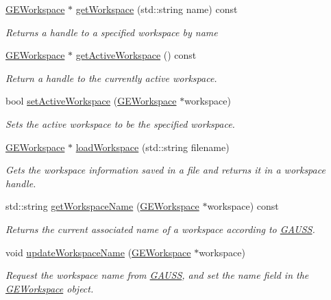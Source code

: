 \begin{DoxyCompactItemize}
\hyperlink{class_g_e_workspace}{G\+E\+Workspace} $\ast$ \hyperlink{class_g_a_u_s_s_a5b2fb78a745be14e4e66a4fd5c5388eb}{get\+Workspace} (std\+::string name) const
\begin{DoxyCompactList}\small\item\em Returns a handle to a specified workspace by {\itshape name} \end{DoxyCompactList}\item 
\hyperlink{class_g_e_workspace}{G\+E\+Workspace} $\ast$ \hyperlink{class_g_a_u_s_s_a34f3cc44cd296cc326ced670d2ac6a59}{get\+Active\+Workspace} () const
\begin{DoxyCompactList}\small\item\em Return a handle to the currently active workspace. \end{DoxyCompactList}\item 
bool \hyperlink{class_g_a_u_s_s_a6b94adbb7ad799f1e025cd4d7f08f75b}{set\+Active\+Workspace} (\hyperlink{class_g_e_workspace}{G\+E\+Workspace} $\ast$workspace)
\begin{DoxyCompactList}\small\item\em Sets the active workspace to be the specified workspace. \end{DoxyCompactList}\item 
\hyperlink{class_g_e_workspace}{G\+E\+Workspace} $\ast$ \hyperlink{class_g_a_u_s_s_a7735659dac094c3af6c438011afb2a77}{load\+Workspace} (std\+::string filename)
\begin{DoxyCompactList}\small\item\em Gets the workspace information saved in a file and returns it in a workspace handle. \end{DoxyCompactList}\item 
std\+::string \hyperlink{class_g_a_u_s_s_a67fd29c51a61b6f99e01dc0dc94f36c2}{get\+Workspace\+Name} (\hyperlink{class_g_e_workspace}{G\+E\+Workspace} $\ast$workspace) const
\begin{DoxyCompactList}\small\item\em Returns the current associated name of a workspace according to \hyperlink{class_g_a_u_s_s}{G\+A\+U\+SS}. \end{DoxyCompactList}\item 
void \hyperlink{class_g_a_u_s_s_a3c849e0f4162634039390e59ed61054e}{update\+Workspace\+Name} (\hyperlink{class_g_e_workspace}{G\+E\+Workspace} $\ast$workspace)
\begin{DoxyCompactList}\small\item\em Request the workspace name from \hyperlink{class_g_a_u_s_s}{G\+A\+U\+SS}, and set the {\itshape name} field in the \hyperlink{class_g_e_workspace}{G\+E\+Workspace} object. \end{DoxyCompactList}\item 

\end{DoxyCompactItemize}
